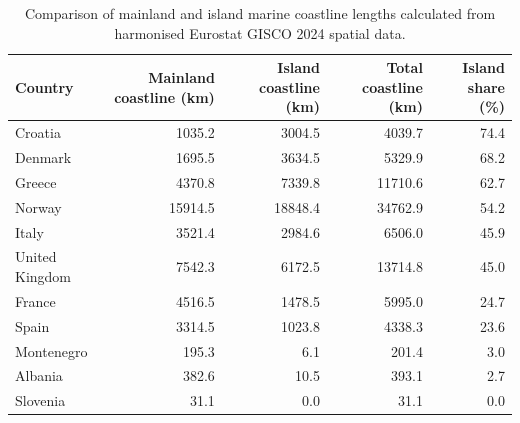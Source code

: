 \begin{table}[htbp]
    \centering
    \caption{Comparison of mainland and island marine coastline lengths calculated from harmonised Eurostat GISCO 2024 spatial data.}
    \label{tab:european_mainland_island_coastline}
    \begin{tabular}{lrrrr}
        \toprule
        Country & Mainland coastline (km) & Island coastline (km) & Total coastline (km) & Island share (\%) \\
        \midrule
        Croatia & \num{1035.2} & \num{3004.5} & \num{4039.7} & \num{74.4} \\
        Denmark & \num{1695.5} & \num{3634.5} & \num{5329.9} & \num{68.2} \\
        Greece & \num{4370.8} & \num{7339.8} & \num{11710.6} & \num{62.7} \\
        Norway & \num{15914.5} & \num{18848.4} & \num{34762.9} & \num{54.2} \\
        Italy & \num{3521.4} & \num{2984.6} & \num{6506.0} & \num{45.9} \\
        United Kingdom & \num{7542.3} & \num{6172.5} & \num{13714.8} & \num{45.0} \\
        France & \num{4516.5} & \num{1478.5} & \num{5995.0} & \num{24.7} \\
        Spain & \num{3314.5} & \num{1023.8} & \num{4338.3} & \num{23.6} \\
        Montenegro & \num{195.3} & \num{6.1} & \num{201.4} & \num{3.0} \\
        Albania & \num{382.6} & \num{10.5} & \num{393.1} & \num{2.7} \\
        Slovenia & \num{31.1} & \num{0.0} & \num{31.1} & \num{0.0} \\
        \bottomrule
    \end{tabular}
\end{table}
